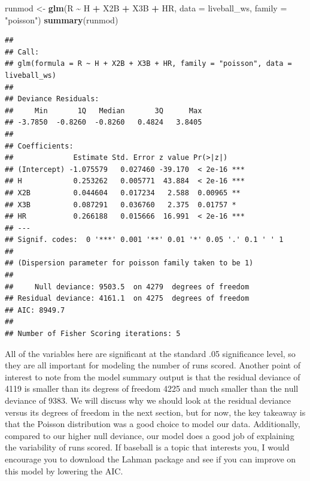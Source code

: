 \documentclass[
]{book}
\newenvironment{Shaded}{\begin{snugshade}}{\end{snugshade}}
\newcommand{\DataTypeTok}[1]{\textcolor[rgb]{0.13,0.29,0.53}{#1}}
\newcommand{\KeywordTok}[1]{\textcolor[rgb]{0.13,0.29,0.53}{\textbf{#1}}}
\newcommand{\NormalTok}[1]{#1}
\newcommand{\OperatorTok}[1]{\textcolor[rgb]{0.81,0.36,0.00}{\textbf{#1}}}
\newcommand{\StringTok}[1]{\textcolor[rgb]{0.31,0.60,0.02}{#1}}
\begin{document}
\begin{Shaded}
\begin{Highlighting}[]
\NormalTok{runmod \textless{}{-}}\StringTok{ }\KeywordTok{glm}\NormalTok{(R }\OperatorTok{\textasciitilde{}}\StringTok{ }\NormalTok{H }\OperatorTok{+}\StringTok{ }\NormalTok{X2B }\OperatorTok{+}\StringTok{ }\NormalTok{X3B }\OperatorTok{+}\StringTok{ }\NormalTok{HR, }\DataTypeTok{data =}\NormalTok{ liveball\_ws, }\DataTypeTok{family =} \StringTok{"poisson"}\NormalTok{)}
\KeywordTok{summary}\NormalTok{(runmod)}
\end{Highlighting}
\end{Shaded}

\begin{verbatim}
## 
## Call:
## glm(formula = R ~ H + X2B + X3B + HR, family = "poisson", data = liveball_ws)
## 
## Deviance Residuals: 
##     Min       1Q   Median       3Q      Max  
## -3.7850  -0.8260  -0.8260   0.4824   3.8405  
## 
## Coefficients:
##              Estimate Std. Error z value Pr(>|z|)    
## (Intercept) -1.075579   0.027460 -39.170  < 2e-16 ***
## H            0.253262   0.005771  43.884  < 2e-16 ***
## X2B          0.044604   0.017234   2.588  0.00965 ** 
## X3B          0.087291   0.036760   2.375  0.01757 *  
## HR           0.266188   0.015666  16.991  < 2e-16 ***
## ---
## Signif. codes:  0 '***' 0.001 '**' 0.01 '*' 0.05 '.' 0.1 ' ' 1
## 
## (Dispersion parameter for poisson family taken to be 1)
## 
##     Null deviance: 9503.5  on 4279  degrees of freedom
## Residual deviance: 4161.1  on 4275  degrees of freedom
## AIC: 8949.7
## 
## Number of Fisher Scoring iterations: 5
\end{verbatim}

All of the variables here are significant at the standard .05 significance level, so they are all important for modeling the number of runs scored. Another point of interest to note from the model summary output is that the residual deviance of 4119 is smaller than its degress of freedom 4225 and much smaller than the null deviance of 9383. We will discuss why we should look at the residual deviance versus its degrees of freedom in the next section, but for now, the key takeaway is that the Poisson distribution was a good choice to model our data. Additionally, compared to our higher null deviance, our model does a good job of explaining the variability of runs scored. If baseball is a topic that interests you, I would encourage you to download the Lahman package and see if you can improve on this model by lowering the AIC.
\end{document}
